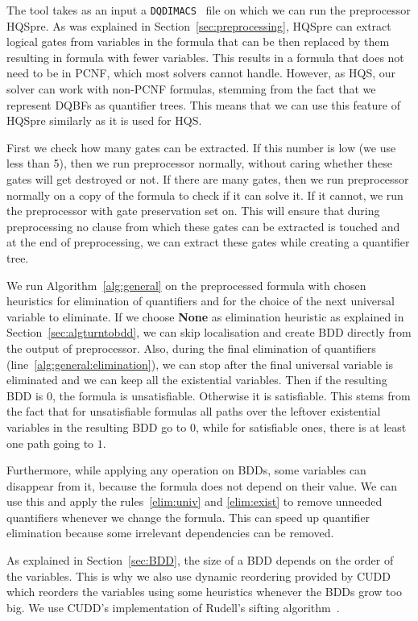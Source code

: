 \documentclass[
  digital, %
  color,
  twoside, %
  table,   %
  nolof,     %
  nolot,     %
]{fithesis3}
\theoremstyle{definition}
\theoremstyle{remark}
\newcommand{\DQDIMACS}[0]{\texttt{DQDIMACS}}
\newcommand{\QEnone}{\textbf{None}}
\begin{document}
The tool takes as an input a \DQDIMACS{}~\cite{iDQandDQDIMACS} file on which we can run the preprocessor HQSpre. As was explained in Section~\ref{sec:preprocessing}, HQSpre can extract logical gates from variables in the formula that can be then replaced by them resulting in formula with fewer variables. This results in a formula that does not need to be in PCNF, which most solvers cannot handle. However, as HQS, our solver can work with non-PCNF formulas, stemming from the fact that we represent DQBFs as quantifier trees. This means that we can use this feature of HQSpre similarly as it is used for HQS.

First we check how many gates can be extracted. If this number is low (we use less than 5), then we run preprocessor normally, without caring whether these gates will get destroyed or not. If there are many gates, then we run preprocessor normally on a copy of the formula to check if it can solve it. If it cannot, we run the preprocessor with gate preservation set on. This will ensure that during preprocessing no clause from which these gates can be extracted is touched and at the end of preprocessing, we can extract these gates while creating a quantifier tree.

We run Algorithm~\ref{alg:general} on the preprocessed formula with chosen heuristics for elimination of quantifiers and for the choice of the next universal variable to eliminate. If we choose \QEnone{} as elimination heuristic as explained in Section~\ref{sec:algturntobdd}, we can skip localisation and create BDD directly from the output of preprocessor. Also, during the final elimination of quantifiers (line~\ref{alg:general:elimination}), we can stop after the final universal variable is eliminated and we can keep all the existential variables. Then if the resulting BDD is $0$, the formula is unsatisfiable. Otherwise it is satisfiable. This stems from the fact that for unsatisfiable formulas all paths over the leftover existential variables in the resulting BDD go to $0$, while for satisfiable ones, there is at least one path going to $1$.

Furthermore, while applying any operation on BDDs, some variables can disappear from it, because the formula does not depend on their value. We can use this and apply the rules~\eqref{elim:univ} and \eqref{elim:exist} to remove unneeded quantifiers whenever we change the formula. This can speed up quantifier elimination because some irrelevant dependencies can be removed.

As explained in Section~\ref{sec:BDD}, the size of a BDD depends on the order of the variables. This is why we also use dynamic reordering provided by CUDD which reorders the variables using some heuristics whenever the BDDs grow too big. We use CUDD's implementation of Rudell's sifting algorithm~\cite{BDDsifting}.
\end{document}
